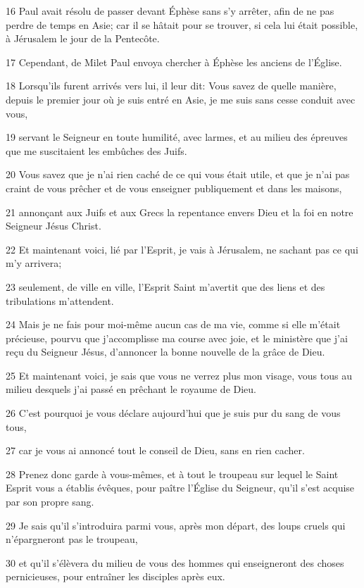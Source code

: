 \par 16 Paul avait résolu de passer devant Éphèse sans s'y arrêter, afin de ne pas perdre de temps en Asie; car il se hâtait pour se trouver, si cela lui était possible, à Jérusalem le jour de la Pentecôte.
\par 17 Cependant, de Milet Paul envoya chercher à Éphèse les anciens de l'Église.
\par 18 Lorsqu'ils furent arrivés vers lui, il leur dit: Vous savez de quelle manière, depuis le premier jour où je suis entré en Asie, je me suis sans cesse conduit avec vous,
\par 19 servant le Seigneur en toute humilité, avec larmes, et au milieu des épreuves que me suscitaient les embûches des Juifs.
\par 20 Vous savez que je n'ai rien caché de ce qui vous était utile, et que je n'ai pas craint de vous prêcher et de vous enseigner publiquement et dans les maisons,
\par 21 annonçant aux Juifs et aux Grecs la repentance envers Dieu et la foi en notre Seigneur Jésus Christ.
\par 22 Et maintenant voici, lié par l'Esprit, je vais à Jérusalem, ne sachant pas ce qui m'y arrivera;
\par 23 seulement, de ville en ville, l'Esprit Saint m'avertit que des liens et des tribulations m'attendent.
\par 24 Mais je ne fais pour moi-même aucun cas de ma vie, comme si elle m'était précieuse, pourvu que j'accomplisse ma course avec joie, et le ministère que j'ai reçu du Seigneur Jésus, d'annoncer la bonne nouvelle de la grâce de Dieu.
\par 25 Et maintenant voici, je sais que vous ne verrez plus mon visage, vous tous au milieu desquels j'ai passé en prêchant le royaume de Dieu.
\par 26 C'est pourquoi je vous déclare aujourd'hui que je suis pur du sang de vous tous,
\par 27 car je vous ai annoncé tout le conseil de Dieu, sans en rien cacher.
\par 28 Prenez donc garde à vous-mêmes, et à tout le troupeau sur lequel le Saint Esprit vous a établis évêques, pour paître l'Église du Seigneur, qu'il s'est acquise par son propre sang.
\par 29 Je sais qu'il s'introduira parmi vous, après mon départ, des loups cruels qui n'épargneront pas le troupeau,
\par 30 et qu'il s'élèvera du milieu de vous des hommes qui enseigneront des choses pernicieuses, pour entraîner les disciples après eux.
